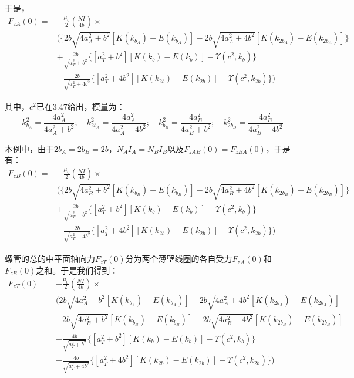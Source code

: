 于是，
\begin{equation}
\begin{split}
F_{zA}(0)=&-\frac{\mu_0}{2}(\frac{N I}{4b})\times \\
&( \{2b\sqrt{4a_A^2+b^2}[K(k_{b_A})-E(k_{b_A})]-2b\sqrt{4a_A^2+4b^2}[K(k_{2b_A})-E(k_{2b_A})]\}\\
&+\frac{2b}{\sqrt{a_T^2+b^2}} \{[a_T^2+b^2][K(k_{b})-E(k_{b})]-\Upsilon(c^2,k_b)\}\\
&-\frac{2b}{\sqrt{a_T^2+4b^2}} \{[a_T^2+4b^2][K(k_{2b})-E(k_{2b})]-\Upsilon(c^2,k_{2b}) \})
\end{split}
\end{equation}

其中，$c^2$已在3.47给出，模量为：
$$k_{b_A}^2=\frac{4a_A^2}{4a_A^2+b^2} ;\quad k_{2b_A}^2=\frac{4a^2_A}{4a_A^2+4b^2};\quad
k_{b_B}^2=\frac{4a_B^2}{4a_B^2+b^2} ;\quad k_{2b_B}^2=\frac{4a^2_B}{4a_B^2+4b^2} $$

本例中，由于$2b_A=2b_B=2b$，$N_A I_A=N_B I_B$以及$F_{zAB}(0)=F_{zBA}(0)$，于是有：
\begin{equation*}
\begin{split}
F_{zB}(0)=&-\frac{\mu_0}{2}(\frac{N I}{4b})\times \\
&\bigg( \{2b\sqrt{4a_B^2+b^2}[K(k_{b_B})-E(k_{b_B})]-2b\sqrt{4a_B^2+4b^2}[K(k_{2b_B})-E(k_{2b_B})]\}\\
&+\frac{2b}{\sqrt{a_T^2+b^2}} \{[a_T^2+b^2][K(k_{b})-E(k_{b})]-\Upsilon(c^2,k_b)\}\\
&-\frac{2b}{\sqrt{a_T^2+4b^2}} \{[a_T^2+4b^2][K(k_{2b})-E(k_{2b})]-\Upsilon(c^2,k_{2b}) \}\bigg)
\end{split}\tag{3.53'}
\end{equation*}

螺管的总的中平面轴向力$F_{zT}(0)$分为两个薄壁线圈的各自受力$F_{zA}(0)$和$F_{zB}(0)$之和。于是我们得到：
\begin{equation}
\begin{split}
F_{zT}(0)=&-\frac{\mu_0}{2}(\frac{N I}{4b})\times \\
&\bigg(2b\sqrt{4a_A^2+b^2}[K(k_{b_A})-E(k_{b_A})]-2b\sqrt{4a_A^2+4b^2}[K(k_{2b_A})-E(k_{2b_A})]\\
&+2b\sqrt{4a_B^2+b^2}[K(k_{b_B})-E(k_{b_B})]-2b\sqrt{4a_B^2+4b^2}[K(k_{2b_B})-E(k_{2b_B})]\\
&+\frac{4b}{\sqrt{a_T^2+b^2}} \{[a_T^2+b^2][K(k_{b})-E(k_{b})]-\Upsilon(c^2,k_b)\}\\
&-\frac{4b}{\sqrt{a_T^2+4b^2}} \{[a_T^2+4b^2][K(k_{2b})-E(k_{2b})]-\Upsilon(c^2,k_{2b}) \}\bigg)
\end{split}
\end{equation}

